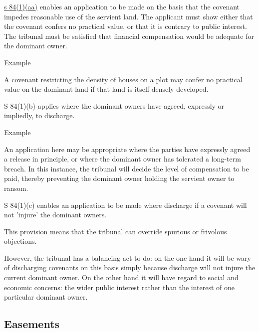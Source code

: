 \documentclass[
]{article}
\newenvironment{env-de3101d4-f08b-48eb-bc0e-2fa06f3bcf8e}
{
    \savenotes\tcolorbox[blanker,breakable,left=5pt,borderline west={2pt}{-4pt}{purple}]
}
{
    \endtcolorbox\spewnotes
}
\begin{document}
\href{https://www.legislation.gov.uk/ukpga/Geo5/15-16/20/section/84}{s
84(1)(aa)} enables an application to be made on the basis that the
covenant impedes reasonable use of the servient land. The applicant must
show either that the covenant confers no practical value, or that it is
contrary to public interest. The tribunal must be satisfied that
financial compensation would be adequate for the dominant owner.

\begin{env-de3101d4-f08b-48eb-bc0e-2fa06f3bcf8e}

Example

A covenant restricting the density of houses on a plot may confer no
practical value on the dominant land if that land is itself densely
developed.

\end{env-de3101d4-f08b-48eb-bc0e-2fa06f3bcf8e}

S 84(1)(b) applies where the dominant owners have agreed, expressly or
impliedly, to discharge.

\begin{env-de3101d4-f08b-48eb-bc0e-2fa06f3bcf8e}

Example

An application here may be appropriate where the parties have expressly
agreed a release in principle, or where the dominant owner has tolerated
a long-term breach. In this instance, the tribunal will decide the level
of compensation to be paid, thereby preventing the dominant owner
holding the servient owner to ransom.

\end{env-de3101d4-f08b-48eb-bc0e-2fa06f3bcf8e}

S 84(1)(c) enables an application to be made where discharge if a
covenant will not 'injure' the dominant owners.

This provision means that the tribunal can override spurious or
frivolous objections.

However, the tribunal has a balancing act to do: on the one hand it will
be wary of discharging covenants on this basis simply because discharge
will not injure the current dominant owner. On the other hand it will
have regard to social and economic concerns: the wider public interest
rather than the interest of one particular dominant owner.

\hypertarget{easements}{%
\subsection{Easements}\label{easements}}
\end{document}
